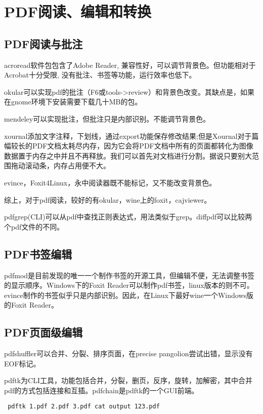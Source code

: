 \section{PDF阅读、编辑和转换}

\subsection{PDF阅读与批注}
acroread软件包包含了Adobe Reader, 兼容性好，可以调节背景色。但功能相对于Acrobat十分受限, 没有批注、书签等功能，运行效率也低下。

okular可以实现pdf的批注（F6或tools->review）和背景色改变。其缺点是，如果在gnome环境下安装需要下载几十MB的包。

mendeley可以实现批注，但批注只是内部识别。不能调节背景色。

xournal添加文字注释，下划线，通过export功能保存修改结果;但是Xournal对于篇幅较长的PDF文档太耗尽内存，因为它会将PDF文档中所有的页面都转化为图像数据置于内存之中并且不再释放。我们可以首先对文档进行分割。据说只要别大范围拖动滚动条，内存占用便不大。

evince，Foxit4Linux，永中阅读器既不能标记，又不能改变背景色。

综上，对于pdf阅读，较好的有okular，wine上的foxit，cajviewer。

pdfgrep(CLI)可以从pdf中查找正则表达式，用法类似于grep。diffpdf可以比较两个pdf文件的不同。

\subsection{PDF书签编辑}
pdfmod是目前发现的唯一一个制作书签的开源工具，但编辑不便，无法调整书签的显示顺序。Windows下的Foxit Reader可以制作pdf书签，linux版本的则不可。evince制作的书签似乎只是内部识别。因此，在Linux下最好wine一个Windows版的Foxit Reader。

\subsection{PDF页面级编辑}

pdfshuffler可以合并、分裂、排序页面，在precise pangolion尝试出错，显示没有EOF标记。

pdftk为CLI工具，功能包括合并，分裂，删页，反序，旋转，加解密，其中合并pdf的方式包括连接和互插。pdfchain是pdftk的一个GUI前端。
\begin{verbatim}
 pdftk 1.pdf 2.pdf 3.pdf cat output 123.pdf
\end{verbatim}

